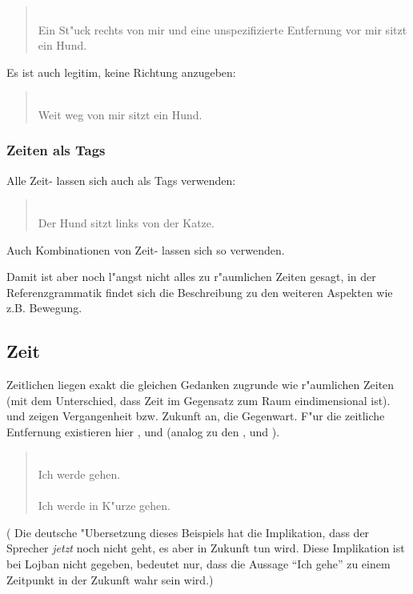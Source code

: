 \begin{quote}
 \\
Ein St"uck rechts von mir und eine unspezifizierte Entfernung vor mir sitzt ein Hund.
\end{quote}

Es ist auch legitim, keine Richtung anzugeben:
\begin{quote}
 \\
Weit weg von mir sitzt ein Hund.
\end{quote}

\subsubsection{Zeiten als Tags}
Alle Zeit- lassen sich auch als Tags verwenden:
\begin{quote}
 \\
Der Hund sitzt links von der Katze.
\end{quote}
Auch Kombinationen von Zeit- lassen sich so verwenden.

Damit ist aber noch l"angst nicht alles zu r"aumlichen Zeiten gesagt, in der Referenzgrammatik findet sich die Beschreibung zu den weiteren
Aspekten wie z.B. Bewegung.

\subsection{Zeit}
Zeitlichen  liegen exakt die gleichen Gedanken zugrunde wie r"aumlichen Zeiten (mit dem Unterschied, dass Zeit im Gegensatz zum
Raum eindimensional ist).  und  zeigen Vergangenheit bzw. Zukunft an,  die Gegenwart. F"ur die zeitliche Entfernung existieren 
hier ,  und  (analog zu den  ,  und ).
\begin{quote}
 \\
Ich werde gehen. \\
 \\
Ich werde in K"urze gehen.
\end{quote}
( Die deutsche "Ubersetzung dieses Beispiels hat die Implikation, dass der Sprecher \emph{jetzt} noch nicht geht, es
aber in Zukunft tun wird. Diese Implikation ist bei Lojban nicht gegeben,  bedeutet nur, dass die Aussage ``Ich gehe'' zu einem
Zeitpunkt in der Zukunft wahr sein wird.)


